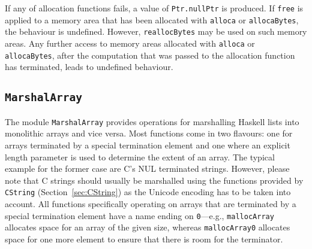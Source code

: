 \documentclass[a4paper,twoside]{article}
\newcommand{\code}[1]{\texttt{#1}}      %
\begin{document}
%
If any of allocation functions fails, a value of \code{Ptr.nullPtr} is
produced.  If \code{free} is applied to a memory area that has been allocated
with \code{alloca} or \code{allocaBytes}, the behaviour is undefined.
However, \code{reallocBytes} may be used on such memory areas.  Any further
access to memory areas allocated with \code{alloca} or \code{allocaBytes},
after the computation that was passed to the allocation function has
terminated, leads to undefined behaviour.

\subsection{\code{MarshalArray}}
\label{sec:MarshalArray}

The module \code{MarshalArray} provides operations for marshalling Haskell
lists into monolithic arrays and vice versa.  Most functions come in two
flavours: one for arrays terminated by a special termination element and one
where an explicit length parameter is used to determine the extent of an
array.  The typical example for the former case are C's NUL terminated
strings.  However, please note that C strings should usually be marshalled
using the functions provided by \code{CString} (Section~\ref{sec:CString}) as
the Unicode encoding has to be taken into account.  All functions specifically
operating on arrays that are terminated by a special termination element have
a name ending on \code{0}---e.g., \code{mallocArray} allocates space for an
array of the given size, whereas \code{mallocArray0} allocates space for one
more element to ensure that there is room for the terminator.
\end{document}
